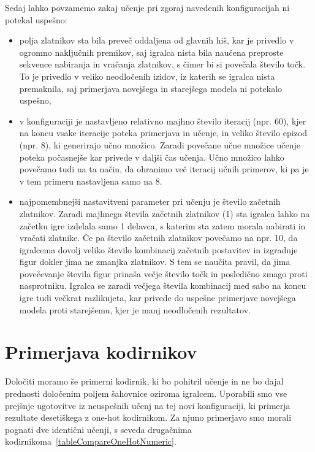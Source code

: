 \documentclass[a4paper, 12pt]{book}
\begin{document}
Sedaj lahko povzamemo zakaj učenje pri zgoraj navedenih konfiguracijah ni potekal uspešno:
\begin{itemize}
	\item polja zlatnikov sta bila preveč oddaljena od glavnih hiš, kar je privedlo v ogromno naključnih premikov, saj igralca nista bila naučena preproste sekvence nabiranja in vračanja zlatnikov, s čimer bi si povečala število točk.
	To je privedlo v veliko neodločenih izidov, iz katerih se igralca nista premaknila, saj primerjava novejšega in starejšega modela ni potekalo uspešno,
	\item v konfiguraciji je nastavljeno relativno majhno število iteracij (npr. 60), kjer na koncu vsake iteracije poteka primerjava in učenje, in veliko število epizod (npr. 8), ki generirajo učno množico.
	Zaradi povečane učne množice učenje poteka počasnejše kar privede v daljši čas učenja. Učno množico lahko povečamo tudi na ta način, da ohranimo več iteracij učnih primerov, ki pa je v tem primeru nastavljena samo na 8.	
	\item najpomembnejši nastavitveni parameter pri učenju je število začetnih zlatnikov.
	Zaradi majhnega števila začetnih zlatnikov (1) sta igralca lahko na začetku igre izdelala samo 1 delavca, s katerim sta zatem morala nabirati in vračati zlatnike.
	Če pa število začetnih zlatnikov povečamo na npr. 10, da igralcema dovolj veliko število kombinacij začetnih postavitev in izgradnje figur dokler jima ne zmanjka zlatnikov.
	S tem se naučita pravil, da jima povečevanje števila figur prinaša večje število točk in posledično zmago proti nasprotniku.
	Igralca se zaradi večjega števila kombinacij med sabo na koncu igre tudi večkrat razlikujeta, kar privede do uspešne primerjave novejšega modela proti starejšemu, kjer je manj neodločenih rezultatov.
	
\end{itemize}

\section{Primerjava kodirnikov}

Določiti moramo še primerni kodirnik, ki bo pohitril učenje in ne bo dajal prednosti določenim poljem šahovnice oziroma igralcem.
Uporabili smo vse prejšnje ugotovitve iz neuspešnih učenj na tej novi konfiguraciji, ki primerja rezultate desetiškega z one-hot kodirnikom.
Za njuno primerjavo smo morali pognati dve identični učenji, s seveda drugačnima kodirnikoma~\ref{tableCompareOneHotNumeric}.
\end{document}
